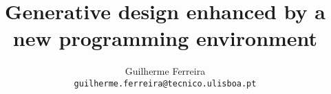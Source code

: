 \documentclass[runningheads,a4paper]{llncs2e/llncs}
\begin{document}
\title{Generative design enhanced by a new programming environment}
\author{Guilherme Ferreira \\ \texttt{guilherme.ferreira@tecnico.ulisboa.pt}}

\maketitle


%







%

% 
% 
 

 
\end{document}
